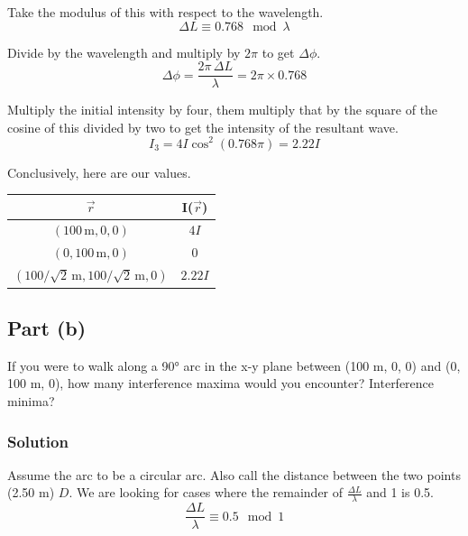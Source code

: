 \documentclass[12pt]{article}
\begin{document}
                Take the modulus of this with respect to the wavelength.
                \begin{equation}
                    \Delta L \equiv 0.768 \mod \lambda
                \end{equation}

                Divide by the wavelength and multiply by $2\pi$ to get $\Delta \phi$.
                \begin{equation}
                    \Delta \phi = \frac{2\pi\,\Delta L}{\lambda}
                        =   2\pi \times 0.768
                \end{equation}
                
                Multiply the initial intensity by four, them multiply that by the square of the cosine of this divided by two to get the intensity of the resultant wave.
                \begin{equation}
                    I_3 =   4I\cos^2\left( 0.768\pi \right)
                        =   2.22I
                \end{equation}

                Conclusively, here are our values.
                \begin{center}
                    \begin{tabular}{|c|c|}
                        \hline
                        \textbf{$\vec{r}$} & \textbf{I($\vec{r}$)}\\
                        \hline
                        $(100\,\unit{\meter}, 0, 0)$ & $4I$\\
                        \hline
                        $(0, 100\,\unit{\meter}, 0)$ & $0$\\
                        \hline
                        $(100/\sqrt{2}\,\unit{\meter}, 100/\sqrt{2}\,\unit{\meter}, 0)$ & $2.22I$\\
                        \hline
                    \end{tabular}
                \end{center}

        \subsection{Part (b)}
            If you were to walk along a 90\unit{\degree} arc in the x-y plane between (100 m, 0, 0) and (0, 100 m, 0), how many interference maxima would you encounter?
            Interference minima?

            \subsubsection{Solution}
                Assume the arc to be a circular arc.
                Also call the distance between the two points (2.50 m) $D$.
                We are looking for cases where the remainder of $\frac{\Delta L}{\lambda}$ and 1 is 0.5.
            \begin{equation}
                \frac{\Delta L}{\lambda} \equiv 0.5 \mod 1
            \end{equation}
\end{document}
